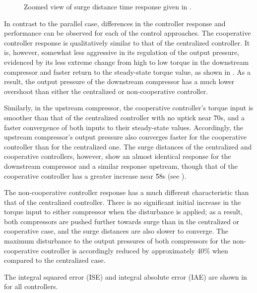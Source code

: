 \begin{figure}
  \resizebox{\linewidth}{!}{%
    
  }
  \caption[Zoomed view of surge distance time response of serial system.]{Zoomed view of surge distance time response given in .}
  \label{fig:res:serial-sd-zoom}
\end{figure}

In contrast to the parallel case, differences in the controller response and performance can be observed for each of the control approaches.
The cooperative controller response is qualitatively similar to that of the centralized controller.
It is, however, somewhat less aggressive in its regulation of the output pressure, evidenced by its less extreme change from high to low torque in the downstream compressor and faster return to the steady-state torque value, as shown in .
As a result, the output pressure of the downstream compressor has a much lower overshoot than either the centralized or non-cooperative controller.

Similarly, in the upstream compressor, the cooperative controller's torque input is smoother than that of the centralized controller with no uptick near \u{70}{s}, and a faster convergence of both inputs to their steady-state values.
Accordingly, the upstream compressor's output pressure also converges faster for the cooperative controller than for the centralized one.
The surge distances of the centralized and cooperative controllers, however, show an almost identical response for the downstream compressor and a similar response upstream, though that of the cooperative controller has a greater increase near \u{58}{s} (see ).

The non-cooperative controller response has a much different characteristic than that of the centralized controller.
There is no significant initial increase in the torque input to either compressor when the disturbance is applied; as a result, both compressors are pushed further towards surge than in the centralized or cooperative case, and the surge distances are also slower to converge.
The maximum disturbance to the output pressures of both compressors for the non-cooperative controller is accordingly reduced by approximately 40\% when compared to the centralized case.

The integral squared error (ISE) and integral absolute error (IAE) are shown in  for all controllers.

